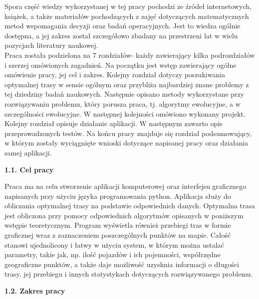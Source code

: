 \documentclass[a4paper, twoside, 12pt, justified]{article}
\begin{document}
	
	Spora część wiedzy wykorzystanej w tej pracy pochodzi ze źródeł internetowych, książek, a także materiałów pochodzących z zajęć dotyczących matematycznych metod wspomagania decyzji oraz badań operacyjnych. Jest to wiedza ogólnie dostępna, a jej zakres został szczegółowo zbadany na przestrzeni lat w wielu pozycjach literatury naukowej.\\
	
	Praca została podzielona na 7 rozdziałów- każdy zawierający kilka podrozdziałów i szerzej omówionych zagadnień. Na początku jest wstęp zawierający ogólne omówienie pracy, jej cel i zakres. Kolejny rozdział dotyczy poszukiwania optymalnej trasy w sensie ogólnym oraz przybliża najbardziej znane problemy z tej dziedziny badań naukowych. Następnie opisano metody wykorzystane przy rozwiązywaniu problemu, który porusza praca, tj. algorytmy ewolucyjne, a w szczególności ewolucyjne. W następnej kolejności omówiono wykonany projekt. Kolejny rozdział opisuje działanie aplikacji. W następnym zawarto opis przeprowadzonych testów. Na końcu pracy znajduje się rozdział podsumowujący, w którym zostały wyciągnięte wnioski dotyczące napisanej pracy oraz działania samej aplikacji.
	
	\newpage
	
	\begin{flushleft}
		\begin{large}
			\textbf{1.1. Cel pracy}
		\end{large}
	\end{flushleft}
	\vspace{5mm} %
	
	Praca ma na celu stworzenie aplikacji komputerowej oraz interfejsu graficznego napisanych przy użyciu języka programowania python. Aplikacja służy do obliczania optymalnej trasy na podstawie odpowiednich danych. Optymalna trasa jest obliczona przy pomocy odpowiednich algorytmów opisanych w poniższym wstępie teoretycznym. Program wyświetla również przebiegi tras w formie graficznej wraz z zaznaczeniem poszczególnych punktów na mapie. Całość stanowi ujednolicony i łatwy w użyciu system, w którym można ustalać parametry, takie jak, np. ilość pojazdów i ich pojemności, współrzędne geograficzne punktów, a także daje możliwość uzysknia informacji o długości trasy, jej przebiegu i innych statystykach dotyczących rozwiązywanego problemu.  
	\vspace{5mm} %
	
	\begin{flushleft}
		\begin{large}
			\textbf{1.2. Zakres pracy}
		\end{large}
	\end{flushleft}
	\vspace{5mm} %
	
\end{document}
